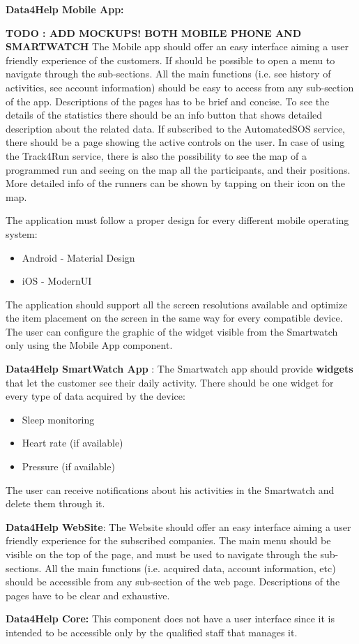 \textbf{Data4Help Mobile App:}

\textbf{TODO : ADD MOCKUPS! BOTH MOBILE PHONE AND SMARTWATCH} \newline
The Mobile app should offer an easy interface aiming a user friendly experience of the customers. If should be possible to open a menu to navigate through the sub-sections. All the main functions (i.e. see history of activities, see account information) should be easy to access from any sub-section of the app. 
Descriptions of the pages has to be brief and concise.
To see the details of the statistics there should be an info button that shows detailed description about the related data.
If subscribed to the AutomatedSOS service, there should be a page showing the active controls on the user.
In case of using the Track4Run service, there is also the possibility to see the map of a programmed run and seeing on the map all the participants, and their positions. More detailed info of the runners can be shown by tapping on their icon on the map.

The application must follow a proper design for every different mobile operating system:
\begin{itemize}
    \item Android - \vspace{0.3cm} Material Design
    \item iOS - \vspace{0.3cm} ModernUI
\end{itemize}
The application should support all the screen resolutions available and optimize the item placement on the screen in the same way for every compatible device.
\newline
The user can configure the graphic of the widget visible from the Smartwatch only using the Mobile App component.



\textbf{Data4Help SmartWatch App} :
The Smartwatch app should provide \textbf{widgets} that let the customer see their daily activity.
There should be one widget for every type of data acquired by the device:
\begin{itemize}
    \item Sleep monitoring 
    \item Heart rate (if available)
    \item Pressure (if available)
\end{itemize}
The user can receive notifications about his activities in the Smartwatch and delete them through it.
\newline

\textbf{Data4Help WebSite}: The Website should offer an easy interface aiming a user friendly experience for the subscribed companies. The main menu should be visible on the top of the page, and must be used to navigate through the sub-sections. All the main functions (i.e. acquired data, account information, etc) should be accessible from any sub-section of the web page. 
Descriptions of the pages have to be clear and exhaustive.
\newline

\textbf{Data4Help Core:} This component does not have a user interface since it is intended to be accessible only by the qualified staff that manages it. 